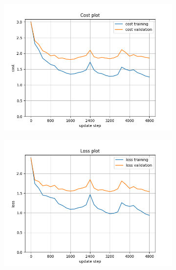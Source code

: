\documentclass[12pt, a4paper]{article}
\begin{document}
\begin{figure}[H]
    \centering
    \begin{subfigure}{0.45\textwidth}
        \centering
        \includegraphics[width=\textwidth]{results/3-800cost.png}
    \end{subfigure}
    \hfill
    \begin{subfigure}{0.45\textwidth}
        \centering
        \includegraphics[width=\textwidth]{results/3-800loss.png}
    \end{subfigure}
    \hfill
    \begin{subfigure}{0.45\textwidth}
        \centering

\end{subfigure}
\end{figure}
\end{document}
